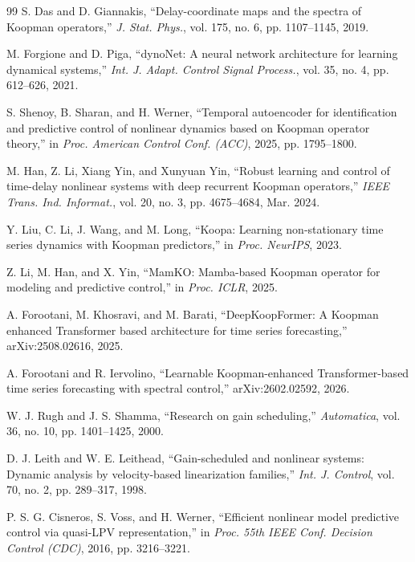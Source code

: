 \documentclass[journal]{IEEEtran}
\begin{document}
\begin{thebibliography}{99}
S. Das and D. Giannakis, ``Delay-coordinate maps and the spectra of Koopman operators,'' \emph{J. Stat. Phys.}, vol. 175, no. 6, pp. 1107--1145, 2019.

M. Forgione and D. Piga, ``dynoNet: A neural network architecture for learning dynamical systems,'' \emph{Int. J. Adapt. Control Signal Process.}, vol. 35, no. 4, pp. 612--626, 2021.

S. Shenoy, B. Sharan, and H. Werner, ``Temporal autoencoder for identification and predictive control of nonlinear dynamics based on Koopman operator theory,'' in \emph{Proc. American Control Conf. (ACC)}, 2025, pp. 1795--1800.

M. Han, Z. Li, Xiang Yin, and Xunyuan Yin, ``Robust learning and control of time-delay nonlinear systems with deep recurrent Koopman operators,'' \emph{IEEE Trans. Ind. Informat.}, vol. 20, no. 3, pp. 4675--4684, Mar. 2024.

Y. Liu, C. Li, J. Wang, and M. Long, ``Koopa: Learning non-stationary time series dynamics with Koopman predictors,'' in \emph{Proc. NeurIPS}, 2023.

Z. Li, M. Han, and X. Yin, ``MamKO: Mamba-based Koopman operator for modeling and predictive control,'' in \emph{Proc. ICLR}, 2025.

A. Forootani, M. Khosravi, and M. Barati, ``DeepKoopFormer: A Koopman enhanced Transformer based architecture for time series forecasting,'' arXiv:2508.02616, 2025.

A. Forootani and R. Iervolino, ``Learnable Koopman-enhanced Transformer-based time series forecasting with spectral control,'' arXiv:2602.02592, 2026.

W. J. Rugh and J. S. Shamma, ``Research on gain scheduling,'' \emph{Automatica}, vol. 36, no. 10, pp. 1401--1425, 2000.

D. J. Leith and W. E. Leithead, ``Gain-scheduled and nonlinear systems: Dynamic analysis by velocity-based linearization families,'' \emph{Int. J. Control}, vol. 70, no. 2, pp. 289--317, 1998.

P. S. G. Cisneros, S. Voss, and H. Werner, ``Efficient nonlinear model predictive control via quasi-LPV representation,'' in \emph{Proc. 55th IEEE Conf. Decision Control (CDC)}, 2016, pp. 3216--3221.


\end{thebibliography}
\end{document}
